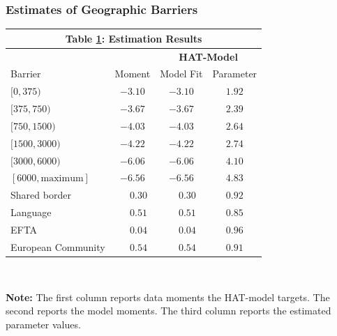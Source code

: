 \documentclass[9pt,pdftex,aspectratio=1610]{beamer}
\theoremstyle{definition}
\begin{document}

\begin{frame}[t]
\frametitle{Estimates of Geographic Barriers}
\begin{table}[t]
\small
\begin{center}
\setlength {\tabcolsep}{5.5mm}
\renewcommand{\arraystretch}{1.10}\label{tb-grav-est}
\begin{tabular}[t]{l c c c}
\multicolumn{4}{c}{{\normalsize\textbf{Table \ref{tb-grav-est}: Estimation Results}} }
\\\hline \hline
& & \multicolumn{2}{c}{\textbf{HAT-Model}}  \\
\cmidrule(lr){3-4}
Barrier& Moment & Model Fit & Parameter \\
\hline $[0,375)$                &$-3.10 $           & $-3.10 $              & $1.92$           \\
$[375,750)$                     &$-3.67 $           & $-3.67 $              & $2.39$           \\
$[750,1500)$                    &$-4.03 $           & $-4.03 $              & $2.64$           \\
$[1500,3000)$                   &$-4.22 $           & $-4.22 $              & $2.74$           \\
$[3000,6000)$                   &$-6.06 $           & $-6.06 $              & $4.10$           \\
$[6000,\mbox{maximum}]$         &$-6.56 $           & $-6.56 $              & $4.83$           \\
Shared border                   &$\phantom{-}0.30$  & $\phantom{-}0.30$     & $0.92$  \\
Language                        &$\phantom{-}0.51$  & $\phantom{-}0.51$     & $0.85$  \\
EFTA                            &$\phantom{-}0.04$  & $\phantom{-}0.04$     & $0.96$  \\
European Community              &$\phantom{-}0.54$  & $\phantom{-}0.54$     & $0.91$  \\
\hline
\end{tabular}
\\[0.5ex]
\parbox{4.2in}{\footnotesize \textbf{Note:} The first column reports data moments the HAT-model targets. The second reports the model moments. The third column reports the estimated parameter values.}
\end{center}
\end{table}
\bigskip
\end{frame}
\end{document}

